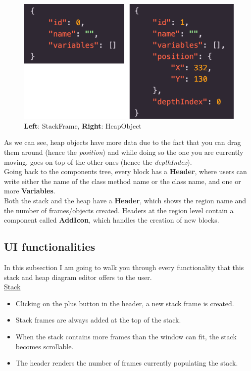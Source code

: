 \documentclass[]{usiinfbachelorproject}
\begin{document}
\begin{figure}[h!]
\centering
\includegraphics[scale=.3]{figures/blocks_data.png}
\caption {\textbf{Left}: StackFrame, \textbf{Right}: HeapObject}
\label{tree}
\end{figure}

\noindent As we can see, heap objects have more data due to the fact that you can drag them around (hence the \emph{position}) and while doing so the one you are currently moving, goes on top of the other ones (hence the \emph{depthIndex}).\\
Going back to the components tree, every block has a \textbf{Header}, where users can write either the name of the class method name or the class name, and one or more \textbf{Variables}.\\
Both the stack and the heap have a \textbf{Header}, which shows the region name and the number of frames/objects created. Headers at the region level contain a component called \textbf{AddIcon}, which handles the creation of new blocks.

\subsection{UI functionalities}

In this subsection I am going to walk you through every functionality that this stack and heap diagram editor offers to the user.\\

\ul{Stack}

\begin{itemize}
	\item Clicking on the plus button in the header, a new stack frame is created.
	\item Stack frames are always added at the top of the stack.
	\item When the stack contains more frames than the window can fit, the stack becomes scrollable. 
	\item The header renders the number of frames currently populating the stack.
\end{itemize}\
\end{document}
